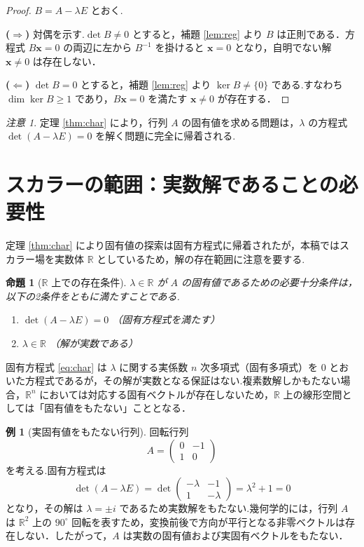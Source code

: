 \documentclass[11pt,a4paper]{article}
\theoremstyle{definition}
\newtheorem{example}{例}
\theoremstyle{plain}
\newtheorem{proposition}{命題}
\theoremstyle{remark}
\newtheorem*{remark}{注意}
\newcommand{\R}{\mathbb{R}}
\begin{document}
\begin{proof}
$B = A - \lambda E$ とおく.

\medskip
\noindent\textbf{($\Rightarrow$)}\quad
対偶を示す.$\det B \neq 0$ とすると，補題 \ref{lem:reg} より $B$ は正則である．方程式 $B\mathbf{x} = 0$ の両辺に左から $B^{-1}$ を掛けると $\mathbf{x} = 0$ となり，自明でない解 $\mathbf{x} \neq 0$ は存在しない．

\medskip
\noindent\textbf{($\Leftarrow$)}\quad
$\det B = 0$ とすると，補題 \ref{lem:reg} より $\ker B \neq \{0\}$ である.すなわち $\dim \ker B \geq 1$ であり，$B\mathbf{x} = 0$ を満たす $\mathbf{x} \neq 0$ が存在する．
\end{proof}

\begin{remark}
定理 \ref{thm:char} により，行列 $A$ の固有値を求める問題は，$\lambda$ の方程式 $\det(A - \lambda E) = 0$ を解く問題に完全に帰着される.
\end{remark}

\section{スカラーの範囲：実数解であることの必要性}

定理 \ref{thm:char} により固有値の探索は固有方程式に帰着されたが，本稿ではスカラー場を実数体 $\R$ としているため，解の存在範囲に注意を要する.

\begin{proposition}[$\R$ 上での存在条件]
$\lambda \in \R$ が $A$ の固有値であるための必要十分条件は，以下の2条件をともに満たすことである.
\begin{enumerate}
  \item $\det(A - \lambda E) = 0$ （固有方程式を満たす）
  \item $\lambda \in \R$ （解が実数である）
\end{enumerate}
\end{proposition}

固有方程式 \eqref{eq:char} は $\lambda$ に関する実係数 $n$ 次多項式（固有多項式）を $0$ とおいた方程式であるが，その解が実数となる保証はない.複素数解しかもたない場合，$\R^n$ においては対応する固有ベクトルが存在しないため，$\R$ 上の線形空間としては「固有値をもたない」こととなる．

\begin{example}[実固有値をもたない行列]
回転行列
\[
  A = \begin{pmatrix} 0 & -1 \\ 1 & 0 \end{pmatrix}
\]
を考える.固有方程式は
\[
  \det(A - \lambda E)
  = \det\begin{pmatrix} -\lambda & -1 \\ 1 & -\lambda \end{pmatrix}
  = \lambda^2 + 1 = 0
\]
となり，その解は $\lambda = \pm i$ であるため実数解をもたない.幾何学的には，行列 $A$ は $\R^2$ 上の $90^\circ$ 回転を表すため，変換前後で方向が平行となる非零ベクトルは存在しない．したがって，$A$ は実数の固有値および実固有ベクトルをもたない．
\end{example}
\end{document}
